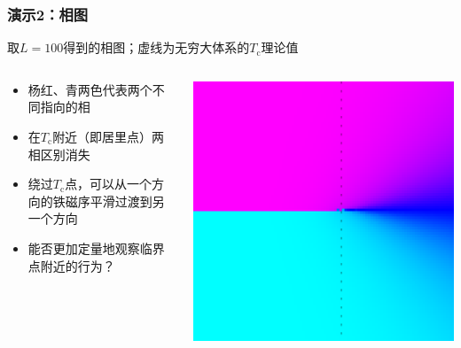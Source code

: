 \documentclass[UTF8]{ctexbeamer}
\begin{document}
\begin{frame}
\frametitle{演示2：相图}

取$L=100$得到的相图；虚线为无穷大体系的$T_\text{c}$理论值

\begin{columns}

\begin{column}{0.5\textwidth}
    \begin{itemize}
        \item 杨红、青两色代表两个不同指向的相
        \item 在$T_\text{c}$附近（即居里点）两相区别消失
        \item 绕过$T_\text{c}$点，可以从一个方向的铁磁序平滑过渡到另一个方向
        \item 能否更加定量地观察临界点附近的行为？
    \end{itemize}
\end{column}

\begin{column}{0.5\textwidth}
    \includegraphics[width=\textwidth]{phase-diagram-L-100.png}
\end{column}

\end{columns}


\end{frame}
\end{document}
